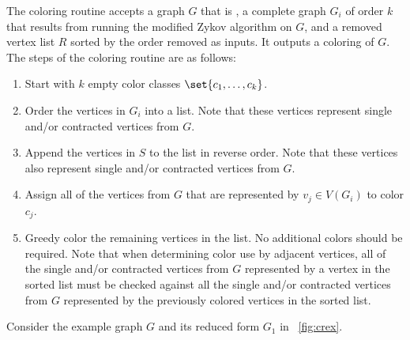 The coloring routine accepts a graph \(G\) that is , a complete graph \(G_i\) of order \(k\) that
results from running the modified Zykov algorithm on \(G\), and a removed vertex list \(R\) sorted by the order
removed as inputs.  It outputs a  coloring of \(G\).  The steps of the coloring routine are as
follows:
\begin{enumerate}
\item Start with \(k\) empty color classes \(\set{c_1,\ldots,c_k}\).
\item Order the vertices in \(G_i\) into a list.  Note that these vertices represent single and/or contracted
  vertices from \(G\).
\item Append the vertices in \(S\) to the list in reverse order.  Note that these vertices also represent
  single and/or contracted vertices from \(G\).
\item Assign all of the vertices from \(G\) that are represented by \(v_j\in V(G_i)\) to color \(c_j\).
\item Greedy color the remaining vertices in the list.  No additional colors should be required.  Note that when
  determining color use by adjacent vertices, all of the single and/or contracted vertices from \(G\) represented
  by a vertex in the sorted list must be checked against all the single and/or contracted vertices from \(G\)
  represented by the previously colored vertices in the sorted list.
\end{enumerate}

Consider the example graph \(G\) and its reduced form \(G_1\) in \figurename~\ref{fig:crex}.

